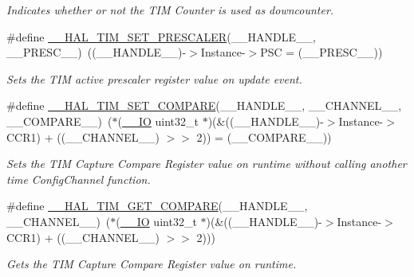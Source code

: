 \begin{DoxyCompactItemize}
\begin{DoxyCompactList}\small\item\em Indicates whether or not the T\-I\-M Counter is used as downcounter. \end{DoxyCompactList}\item 
\#define \hyperlink{group___t_i_m___exported___macros_gafdc5a06eab07e0c24e729fd492bdb27c}{\-\_\-\-\_\-\-H\-A\-L\-\_\-\-T\-I\-M\-\_\-\-S\-E\-T\-\_\-\-P\-R\-E\-S\-C\-A\-L\-E\-R}(\-\_\-\-\_\-\-H\-A\-N\-D\-L\-E\-\_\-\-\_\-, \-\_\-\-\_\-\-P\-R\-E\-S\-C\-\_\-\-\_\-)~((\-\_\-\-\_\-\-H\-A\-N\-D\-L\-E\-\_\-\-\_\-)-\/$>$Instance-\/$>$P\-S\-C = (\-\_\-\-\_\-\-P\-R\-E\-S\-C\-\_\-\-\_\-))
\begin{DoxyCompactList}\small\item\em Sets the T\-I\-M active prescaler register value on update event. \end{DoxyCompactList}\item 
\#define \hyperlink{group___t_i_m___exported___macros_ga300d0c9624c3b072d3afeb7cef639b66}{\-\_\-\-\_\-\-H\-A\-L\-\_\-\-T\-I\-M\-\_\-\-S\-E\-T\-\_\-\-C\-O\-M\-P\-A\-R\-E}(\-\_\-\-\_\-\-H\-A\-N\-D\-L\-E\-\_\-\-\_\-, \-\_\-\-\_\-\-C\-H\-A\-N\-N\-E\-L\-\_\-\-\_\-, \-\_\-\-\_\-\-C\-O\-M\-P\-A\-R\-E\-\_\-\-\_\-)~($\ast$(\hyperlink{core__sc300_8h_aec43007d9998a0a0e01faede4133d6be}{\-\_\-\-\_\-\-I\-O} uint32\-\_\-t $\ast$)(\&((\-\_\-\-\_\-\-H\-A\-N\-D\-L\-E\-\_\-\-\_\-)-\/$>$Instance-\/$>$C\-C\-R1) + ((\-\_\-\-\_\-\-C\-H\-A\-N\-N\-E\-L\-\_\-\-\_\-) $>$$>$ 2)) = (\-\_\-\-\_\-\-C\-O\-M\-P\-A\-R\-E\-\_\-\-\_\-))
\begin{DoxyCompactList}\small\item\em Sets the T\-I\-M Capture Compare Register value on runtime without calling another time Config\-Channel function. \end{DoxyCompactList}\item 
\#define \hyperlink{group___t_i_m___exported___macros_gaa40722f56910966e1da5241b610eed84}{\-\_\-\-\_\-\-H\-A\-L\-\_\-\-T\-I\-M\-\_\-\-G\-E\-T\-\_\-\-C\-O\-M\-P\-A\-R\-E}(\-\_\-\-\_\-\-H\-A\-N\-D\-L\-E\-\_\-\-\_\-, \-\_\-\-\_\-\-C\-H\-A\-N\-N\-E\-L\-\_\-\-\_\-)~($\ast$(\hyperlink{core__sc300_8h_aec43007d9998a0a0e01faede4133d6be}{\-\_\-\-\_\-\-I\-O} uint32\-\_\-t $\ast$)(\&((\-\_\-\-\_\-\-H\-A\-N\-D\-L\-E\-\_\-\-\_\-)-\/$>$Instance-\/$>$C\-C\-R1) + ((\-\_\-\-\_\-\-C\-H\-A\-N\-N\-E\-L\-\_\-\-\_\-) $>$$>$ 2)))
\begin{DoxyCompactList}\small\item\em Gets the T\-I\-M Capture Compare Register value on runtime. \end{DoxyCompactList}\item 

\end{DoxyCompactItemize}

